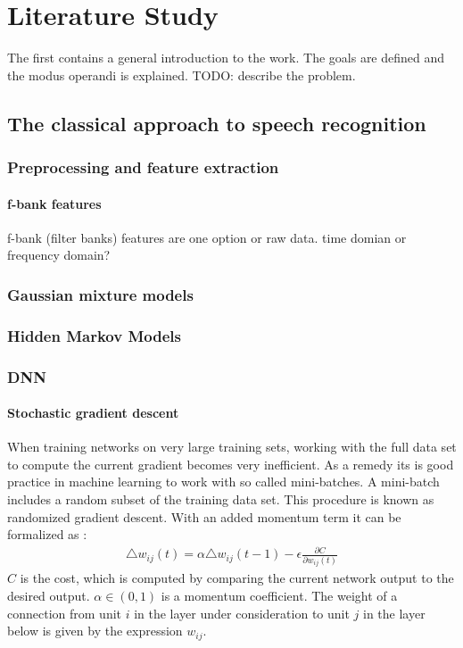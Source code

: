 \chapter{Literature Study}
\label{cha:intro}
The first contains a general introduction to the work. The goals are
defined and the modus operandi is explained.
TODO: describe the problem.


\section{The classical approach to speech recognition}

\subsection{Preprocessing and feature extraction}

\subsubsection{f-bank features}
f-bank (filter banks) features are one option or raw data.
time domian or frequency domain?

\subsection{Gaussian mixture models}

\subsection{Hidden Markov Models}

\subsection{DNN}

\subsubsection{Stochastic gradient descent}
When training networks on very large training sets, working with the full data set to compute the current gradient becomes very inefficient. As a remedy its is good practice in machine learning to work with so called mini-batches. A mini-batch includes a random subset of the training data set. This procedure is known as randomized gradient descent. With an added momentum term it can be formalized as \cite[page 4]{Hinton2012}:
\begin{align}
\triangle w_{ij}(t) = \alpha \triangle w_{ij}(t-1) - \epsilon \frac{\partial C}{\partial w_{ij}(t)}
\end{align}
$C$ is the cost, which is computed by comparing the current network output to the desired output. $\alpha \in (0,1)$ is a momentum coefficient. The weight of a connection from unit $i$ in the layer under consideration to unit $j$ in the layer below is given by the expression $w_{ij}$.

